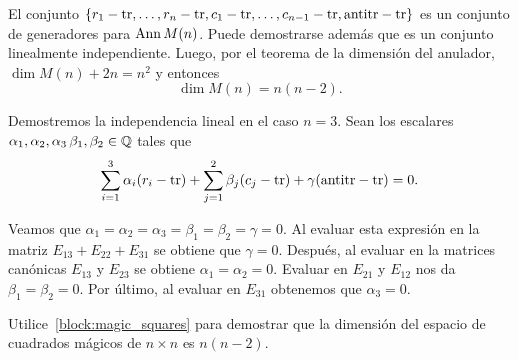 \begin{block}
	El conjunto
	$\{r_1-\operatorname{tr},\dots,r_n-\operatorname{tr},c_1-\operatorname{tr},\dots,c_{n-1}-\operatorname{tr},\mathrm{antitr}-\operatorname{tr}\}$
	es un conjunto de generadores para $\operatorname{Ann} M(n)$. Puede demostrarse además
	que es un conjunto linealmente independiente. Luego, por el teorema de la
	dimensión del anulador, $\dim M(n)+2n=n^2$ y entonces
    \[
        \dim M(n)=n(n-2). 
    \]

    Demostremos la independencia lineal en el caso $n=3$. Sean los escalares
	$\alpha_1,\alpha_2,\alpha_3\,\beta_1,\beta_2\in\mathbb{Q}$ tales que
	\[
        \sum_{i=1}^3 \alpha_i(r_i-\operatorname{tr})+\sum_{j=1}^{2}\beta_j(c_j-\operatorname{tr})+\gamma(\mathrm{antitr}-\operatorname{tr})=0.
	\]
	
	Veamos que $\alpha_1=\alpha_2=\alpha_3=\beta_1=\beta_2=\gamma=0$. Al
	evaluar esta expresión en la matriz $E_{13}+E_{22}+E_{31}$ se obtiene que
	$\gamma=0$.  Después, al evaluar en la matrices canónicas $E_{13}$ y
	$E_{23}$ se obtiene $\alpha_1=\alpha_2=0$.  Evaluar en $E_{21}$ y $E_{12}$
	nos da $\beta_1=\beta_2=0$. Por último, al evaluar en $E_{31}$ obtenemos
	que $\alpha_3=0$.
\end{block}

\begin{xca}
	Utilice~\ref{block:magic_squares} para demostrar que la dimensión del
	espacio de cuadrados mágicos de $n\times n$ es $n(n-2)$. 
\end{xca}

